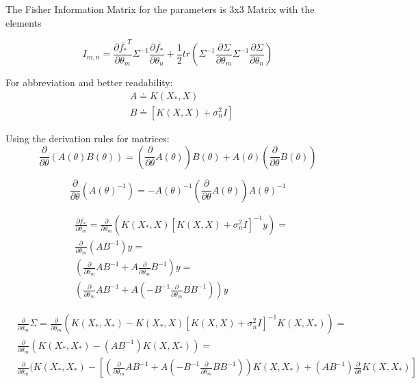 \documentclass[12pt]{article}
\begin{document}
	The Fisher Information Matrix for the parameters is 3x3 Matrix with the elements
	
	\begin{displaymath}
	I_{m,n} = \frac{\partial \bar{f_{*}}^{T}}{\partial \theta_{m}}
				\Sigma^{-1}
				\frac{\partial \bar{f_{*}}}{\partial \theta_{n}}+
				\frac{1}{2}
				tr(\Sigma^{-1} \frac{\partial \Sigma}{\partial \theta_{m}} \Sigma^{-1} \frac{\partial \Sigma}{\partial \theta_{n}})
	\end{displaymath}
	
	For abbreviation and better readability: 
	\begin{align*}
	& A \doteq K(X_{*},X) \\
	& B \doteq [K(X,X) +\sigma^{2}_{n}I]
	\end{align*}
	
	Using the derivation rules for matrices:
	\begin{displaymath}
	\frac{\partial}{\partial \theta}(A(\theta)B(\theta)) = (\frac{\partial}{\partial \theta}A(\theta)) B(\theta) + A(\theta)(\frac{\partial}{\partial \theta}B(\theta))
	\end{displaymath}
	
	\begin{displaymath}
	\frac{\partial}{\partial \theta}(A(\theta)^{-1}) = -A(\theta)^{-1} (\frac{\partial}{\partial \theta} A(\theta)) A(\theta)^{-1}
	\end{displaymath}

	\begin{align*}
	& \frac{\partial \bar{f_{*}}}{\partial \theta_{m}} = \frac{\partial}{\partial \theta_{m}}(K(X_{*},X)[K(X,X) +\sigma^{2}_{n}I]^{-1}y) = \\
	& \frac{\partial}{\partial \theta_{m}} (AB^{-1})y = \\
	& (\frac{\partial}{\partial \theta_{m}} AB^{-1} + A \frac{\partial}{\partial \theta_{m}}B^{-1})y = \\ 
	& (\frac{\partial}{\partial \theta_{m}} AB^{-1} + A (-B^{-1} \frac{\partial}{\partial \theta_{m}}B B^{-1}))y
	\end{align*}
	
	\begin{align*}
	& \frac{\partial}{\partial \theta_{m}}\Sigma = \frac{\partial}{\partial \theta_{m}} (K(X_{*},X_{*})-K(X_{*},X)[K(X,X) + \sigma^{2}_{n}I]^{-1}K(X,X_{*})) = \\
	& \frac{\partial}{\partial \theta_{m}} (K(X_{*},X_{*})-(AB^{-1})K(X,X_{*}))= \\
	& \frac{\partial}{\partial \theta_{m}} (K(X_{*},X_{*}) - [(\frac{\partial}{\partial \theta_{m}}AB^{-1} + A (-B^{-1} \frac{\partial}{\partial \theta_{m}}B B^{-1}))K(X,X_{*}) + (AB^{-1}) \frac{\partial}{\partial \theta} K(X,X_{*})] 
	\end{align*}
\end{document}
